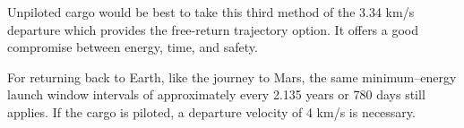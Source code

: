 Unpiloted cargo would be best to take this third method of the 3.34 km/s departure which provides the free-return trajectory option. It offers a good compromise between energy, time, and safety.


For returning back to Earth, like the journey to Mars, the same minimum--energy launch window intervals of approximately every 2.135 years or 780 days still applies. If the cargo is piloted, a departure velocity of 4 km/s is necessary.

